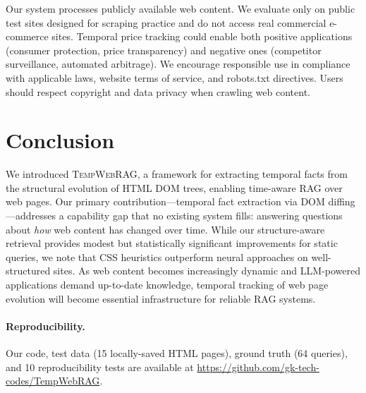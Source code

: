 \documentclass[11pt]{article}
\newcommand{\ours}{\textsc{TempWebRAG}}
\begin{document}
Our system processes publicly available web content. We evaluate only on public test sites designed for scraping practice and do not access real commercial e-commerce sites. Temporal price tracking could enable both positive applications (consumer protection, price transparency) and negative ones (competitor surveillance, automated arbitrage). We encourage responsible use in compliance with applicable laws, website terms of service, and robots.txt directives. Users should respect copyright and data privacy when crawling web content.

\section{Conclusion}

We introduced \ours{}, a framework for extracting temporal facts from the structural evolution of HTML DOM trees, enabling time-aware RAG over web pages. Our primary contribution---temporal fact extraction via DOM diffing---addresses a capability gap that no existing system fills: answering questions about \emph{how} web content has changed over time. While our structure-aware retrieval provides modest but statistically significant improvements for static queries, we note that CSS heuristics outperform neural approaches on well-structured sites. As web content becomes increasingly dynamic and LLM-powered applications demand up-to-date knowledge, temporal tracking of web page evolution will become essential infrastructure for reliable RAG systems.

\paragraph{Reproducibility.} Our code, test data (15 locally-saved HTML pages), ground truth (64 queries), and 10 reproducibility tests are available at \url{https://github.com/gk-tech-codes/TempWebRAG}.
\end{document}
